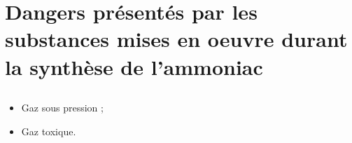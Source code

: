 

\section{Dangers présentés par les substances mises en oeuvre durant la synthèse de l'ammoniac}
\subsection{}
\begin{itemize}
  \item Gaz sous pression ;
  \item Gaz toxique.
\end{itemize}

